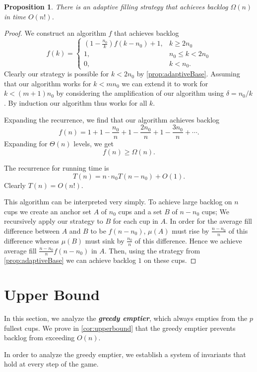 \documentclass[twocolumn]{article}[10pt]
\newcommand{\defn}[1]{{\textit{\textbf{\boldmath #1}}}\xspace}
\newtheorem{proposition}{Proposition}
\begin{document}
\begin{proposition}
  \label{prop:factorialTimeAlg}
  There is an adaptive filling strategy that
  achieves backlog $\Omega(n)$ in time $O(n!)$.
\end{proposition}
\begin{proof}
  We construct an algorithm $f$ that achieves backlog 
  $$f(k) = \begin{cases}
    \left(1-\frac{n_0}{k}\right)f(k-n_0) + 1, &k \ge 2n_0\\
    1,  &n_0\le k < 2n_0 \\
    0, &k< n_0.
  \end{cases}$$
  Clearly our strategy is possible for $k<2n_0$ by 
  \cref{prop:adaptiveBase}.
  Assuming that our algorithm works for $k<mn_0$ we can extend it to work for
  $k<(m+1)n_0$ by considering the amplification of our algorithm using $\delta = n_0/k$.
  By induction our algorithm thus works for all $k$.

  Expanding the recurrence, we find that our algorithm achieves backlog 
  $$f(n) = 1+ 1-\frac{n_0}{n} + 1-\frac{2n_0}{n} + 1-\frac{3n_0}{n} + \cdots .$$
  Expanding for $\Theta(n)$ levels, we get $$f(n) \ge \Omega(n).$$

  The recurrence for running time is 
  $$T(n) = n \cdot n_0T(n-n_0)+O(1).$$
  Clearly $T(n) = O(n!)$.

  This algorithm can be interpreted very simply. To achieve large backlog on
  $n$ cups we create an anchor set $A$ of $n_0$ cups and a set $B$ of $n-n_0$
  cups; We recursively apply our strategy to $B$ for each cup in $A$. In
  order for the average fill difference between $A$ and $B$ to be $f(n-n_0)$,
  $\mu(A)$ must rise by $\frac{n-n_0}{n}$ of this difference whereas $\mu(B)$
  must sink by $\frac{n_0}{n}$ of this difference. Hence we achieve average
  fill $\frac{n-n_0}{n}f(n-n_0)$ in $A$. Then, using the strategy from
  \cref{prop:adaptiveBase} we can achieve backlog $1$ on these cups. 
\end{proof}


\section{Upper Bound}\label{sec:upperBound}

In this section, we analyze the \defn{greedy emptier}, which always empties
from the $p$ fullest cups. We prove in \cref{cor:upperbound} that the
greedy emptier prevents backlog from exceeding $O(n)$. 

In order to analyze the greedy emptier, we establish a system of invariants
that hold at every step of the game. 
\end{document}
